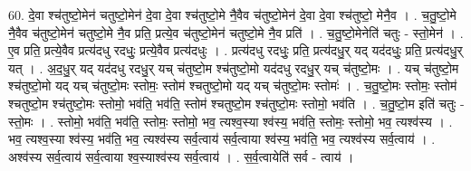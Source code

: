 \documentclass[17pt]{extarticle}
\begin{document}
60. दे॒वा श्च॑तुष्टो॒मेन॑ चतुष्टो॒मेन॑ दे॒वा दे॒वा श्च॑तुष्टो॒मे नै॒वैव च॑तुष्टो॒मेन॑ दे॒वा दे॒वा श्च॑तुष्टो॒ मेनै॒व । . च॒तु॒ष्टो॒मे नै॒वैव च॑तुष्टो॒मेन॑ चतुष्टो॒मे नै॒व प्रति॒ प्रत्ये॒व च॑तुष्टो॒मेन॑ चतुष्टो॒मे नै॒व प्रति॑ । . च॒तु॒ष्टो॒मेनेति॑ चतुः - स्तो॒मेन॑ । . ए॒व प्रति॒ प्रत्ये॒वैव प्रत्य॑दधु रदधुः॒ प्रत्ये॒वैव प्रत्य॑दधुः । . प्रत्य॑दधु रदधुः॒ प्रति॒ प्रत्य॑दधु॒र् यद् यद॑दधुः॒ प्रति॒ प्रत्य॑दधु॒र् यत् । . अ॒द॒धु॒र् यद् यद॑दधु रदधु॒र् यच् च॑तुष्टो॒म श्च॑तुष्टो॒मो यद॑दधु रदधु॒र् यच् च॑तुष्टो॒मः । . यच् च॑तुष्टो॒म श्च॑तुष्टो॒मो यद् यच् च॑तुष्टो॒मः स्तोमः॒ स्तोम॑ श्चतुष्टो॒मो यद् यच् च॑तुष्टो॒मः स्तोमः॑ । . च॒तु॒ष्टो॒मः स्तोमः॒ स्तोम॑ श्चतुष्टो॒म श्च॑तुष्टो॒मः स्तोमो॒ भव॑ति॒ भव॑ति॒ स्तोम॑ श्चतुष्टो॒म श्च॑तुष्टो॒मः स्तोमो॒ भव॑ति । . च॒तु॒ष्टो॒म इति॑ चतुः - स्तो॒मः । . स्तोमो॒ भव॑ति॒ भव॑ति॒ स्तोमः॒ स्तोमो॒ भव॒ त्यश्व॒स्या श्व॑स्य॒ भव॑ति॒ स्तोमः॒ स्तोमो॒ भव॒ त्यश्व॑स्य । . भव॒ त्यश्व॒स्या श्व॑स्य॒ भव॑ति॒ भव॒ त्यश्व॑स्य सर्व॒त्वाय॑ सर्व॒त्वाया श्व॑स्य॒ भव॑ति॒ भव॒ त्यश्व॑स्य सर्व॒त्वाय॑ । . अश्व॑स्य सर्व॒त्वाय॑ सर्व॒त्वाया श्व॒स्याश्व॑स्य सर्व॒त्वाय॑ । . स॒र्व॒त्वायेति॑ सर्व - त्वाय॑ । \newline
\pagebreak
\end{document}
